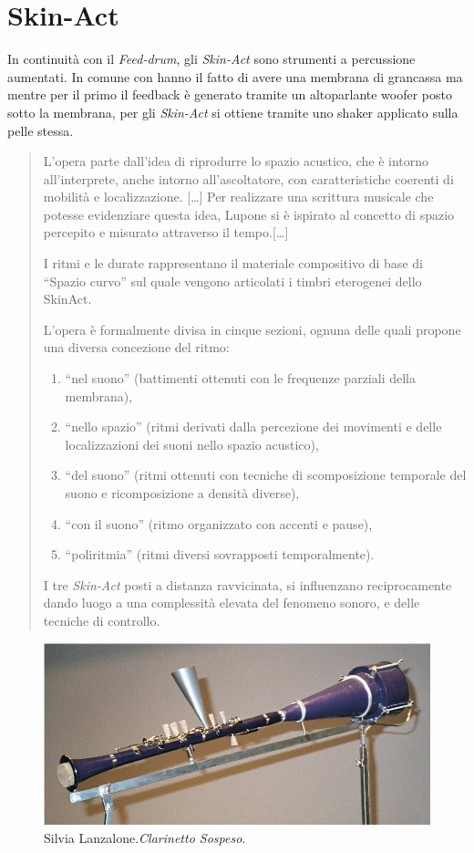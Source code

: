 \section{Skin-Act}

In continuità con il \emph{Feed-drum}, gli \emph{Skin-Act} sono strumenti a percussione aumentati. In comune con hanno il fatto di avere una membrana di grancassa ma
mentre per il primo il feedback è generato tramite un altoparlante woofer posto
sotto la membrana, per gli \emph{Skin-Act} si ottiene tramite uno shaker applicato
sulla pelle stessa.

\begin{quote}
L’opera parte dall’idea di riprodurre lo spazio acustico, che è intorno
all’interprete, anche intorno all’ascoltatore, con caratteristiche coerenti di
mobilità e localizzazione. [\ldots]
Per realizzare una scrittura musicale che potesse evidenziare questa idea,
Lupone si è ispirato al concetto di spazio percepito e misurato attraverso il
tempo.[\ldots]

I ritmi e le durate rappresentano il materiale compositivo di base di
“Spazio curvo” sul quale vengono articolati i timbri eterogenei dello SkinAct.

L’opera è formalmente divisa in cinque sezioni, ognuna delle quali propone una
diversa concezione del ritmo:
\begin{enumerate}
  \item “nel suono” (battimenti ottenuti con le frequenze parziali della membrana),
  \item “nello spazio” (ritmi derivati dalla percezione dei movimenti e delle
localizzazioni dei suoni nello spazio acustico),
  \item“del suono” (ritmi ottenuti con tecniche di scomposizione temporale del
suono e ricomposizione a densità diverse),
  \item“con il suono” (ritmo organizzato con accenti e pause),
  \item“poliritmia” (ritmi diversi sovrapposti temporalmente).
\end{enumerate}

I tre \emph{Skin-Act} posti a distanza ravvicinata, si influenzano reciprocamente dando
luogo a una complessità elevata del fenomeno sonoro, e delle tecniche di
controllo. \cite{wc:straum}
\end{quote}

\begin{figure}%
\centering
\includegraphics[width=0.99\columnwidth]{Graphics/foto/clarinetto_sospeso.PNG}
\caption[]{Silvia Lanzalone.\emph{Clarinetto Sospeso}.}
\label{clarinetto}
\end{figure}

